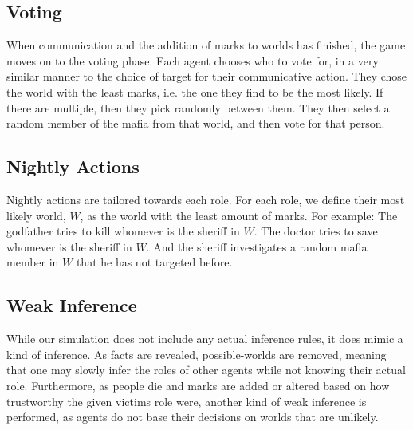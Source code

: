 \subsection{Voting}\label{Voting}
When communication and the addition of marks to worlds has finished, the game moves on to
the voting phase. Each agent chooses who to vote for, in a very similar manner
to the choice of target for their communicative action. They chose the world
with the least marks, i.e. the one they find to be the most likely. If there
are multiple, then they pick randomly between them. They then select a random
member of the mafia from that world, and then vote for that person.
\subsection{Nightly Actions}\label{NightlyActions}
Nightly actions are tailored towards each role. For each role, we define their most likely world, $W$, as the world with the least amount of marks. For example: The
godfather tries to kill whomever is the sheriff in $W$. The doctor tries to save whomever is the sheriff in $W$. And the sheriff investigates a random mafia member in $W$ that he has not targeted before. 
\subsection{Weak Inference}\label{WeakInference}
While our simulation does not include any actual inference rules, it does mimic
a kind of inference. As facts are revealed, possible-worlds are removed,
meaning that one may slowly infer the roles of other agents while not knowing their
actual role. Furthermore, as people die and marks are added or altered based on
how trustworthy the given victims role were, another kind of weak inference is
performed, as agents do not base their decisions on worlds that are unlikely.
